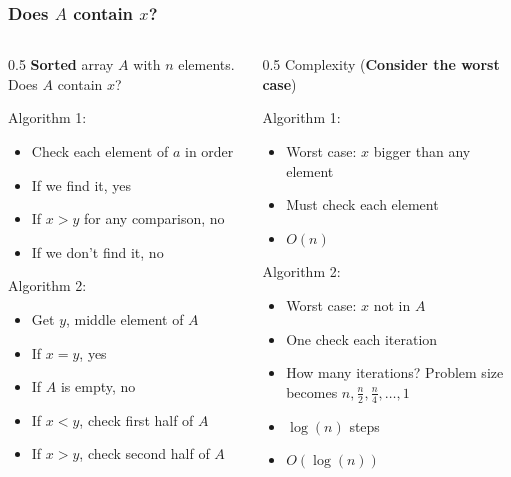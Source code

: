 \documentclass[aspectratio=169,hyperref={bookmarks=false,urlcolor=blue,colorlinks=true},10pt]{beamer}
\begin{document}
\begin{frame}
  \frametitle{Does $A$ contain $x$?}

  \begin{columns}
    \begin{column}{0.5\textwidth}
      \textbf{Sorted} array $A$ with $n$ elements. Does $A$ contain $x$?

      \vspace{\baselineskip}

      \pause
      Algorithm 1:
      \begin{itemize}
      \item Check each element of $a$ in order
      \item If we find it, yes
      \item If $x>y$ for any comparison, no
      \item If we don't find it, no
      \end{itemize}

      \vspace{\baselineskip}

      \pause
      Algorithm 2:
      \begin{itemize}
      \item Get $y$, middle element of $A$
      \item If $x=y$, yes
      \item If $A$ is empty, no
      \item If $x<y$, check first half of $A$
      \item If $x>y$, check second half of $A$
      \end{itemize}
    \end{column}
    \begin{column}{0.5\textwidth}
      \pause
      Complexity (\textbf{Consider the worst case})

      \vspace{\baselineskip}

      \pause
      Algorithm 1:
      \begin{itemize}
      \item Worst case: $x$ bigger than any element
      \item Must check each element
      \item $O(n)$
      \end{itemize}

      \vspace{\baselineskip}

      \pause
      Algorithm 2:
      \begin{itemize}
      \item Worst case: $x$ not in $A$
      \item One check each iteration
      \item How many iterations? Problem size becomes $n,\frac{n}{2},\frac{n}{4},\ldots,1$
      \item $\log(n)$ steps
      \item $O(\log(n))$
      \end{itemize}
    \end{column}
  \end{columns}
\end{frame}
\end{document}

